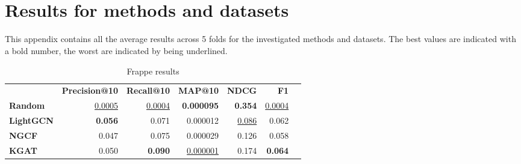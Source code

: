 \section{\\Results for methods and datasets}\label{app:tables}
This appendix contains all the average results across 5 folds for the investigated methods and datasets.
The best values are indicated with a bold number, the worst are indicated by being underlined.


\begin{table}[!htp]\centering
\caption{Frappe results}\label{tab:frappetable}
\scriptsize
\begin{tabular}{lrrrrrr}\toprule
&\textbf{Precision@10} &\textbf{Recall@10} &\textbf{MAP@10} &\textbf{NDCG} &\textbf{F1} \\\cmidrule{2-6}
\textbf{Random} &\ul{0.0005} &\ul{0.0004} &\textbf{0.000095} &\textbf{0.354} &\ul{0.0004} \\\cmidrule{1-6}
\textbf{LightGCN} &\textbf{0.056} &0.071 &0.000012 &\ul{0.086} &0.062 \\\cmidrule{1-6}
\textbf{NGCF} &0.047 &0.075 &0.000029 &0.126 &0.058 \\\midrule
\textbf{KGAT} &0.050 &\textbf{0.090} &\ul{0.000001} &0.174 &\textbf{0.064} \\
\bottomrule
\end{tabular}
\end{table}

